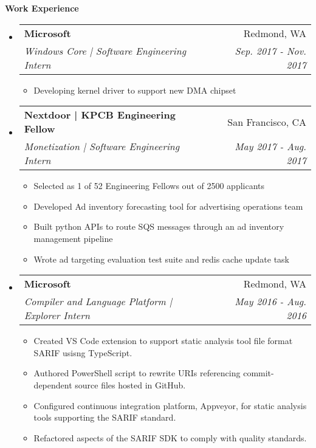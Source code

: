 \documentclass[letterpaper,10pt]{article}
\makeatletter
\newcommand{\resitem}[1]{\item #1 \vspace{-2pt}}
\newcommand{\resheading}[1]{{\large \colorbox{mygrey}{\begin{minipage}{\textwidth}{\textbf{#1 \vphantom{p\^{E}}}}\end{minipage}}}}
\newcommand{\ressubheading}[4]{
\begin{tabular*}{7.0in}{l@{\extracolsep{\fill}}r}
		\textbf{#1} & #2 \\
		\textit{#3} & \textit{#4} \\
\end{tabular*}\vspace{-6pt}}
\makeatother
\begin{document}
\resheading{Work Experience}
\begin{itemize}
\item
	\ressubheading{Microsoft}{Redmond, WA}{Windows Core | Software Engineering Intern}{Sep. 2017 - Nov. 2017}
	\begin{itemize}
		\resitem{Developing kernel driver to support new DMA chipset}
	\end{itemize}
\item
	\ressubheading{Nextdoor | KPCB Engineering Fellow}{San Francisco, CA}{Monetization | Software Engineering Intern}{May 2017 - Aug. 2017}
	\begin{itemize}
		\resitem{Selected as 1 of 52 Engineering Fellows out of 2500 applicants}
		\resitem{Developed Ad inventory forecasting tool for advertising operations team}
		\resitem{Built python APIs to route SQS messages through an ad inventory management pipeline}
		\resitem{Wrote ad targeting evaluation test suite and redis cache update task}
	\end{itemize}
\item
	\ressubheading{Microsoft}{Redmond, WA}{Compiler and Language Platform | Explorer Intern}{May 2016 - Aug. 2016}
	\begin{itemize}
		\resitem{Created VS Code extension to support static analysis tool file format SARIF usisng TypeScript.}
	  \resitem{Authored PowerShell script to rewrite URIs referencing commit-dependent source files hosted in GitHub.}
		\resitem{Configured continuous integration platform, Appveyor, for static analysis tools supporting the SARIF standard.}
		\resitem{Refactored aspects of the SARIF SDK to comply with quality standards.}
	\end{itemize}
\end{itemize}
\end{document}
